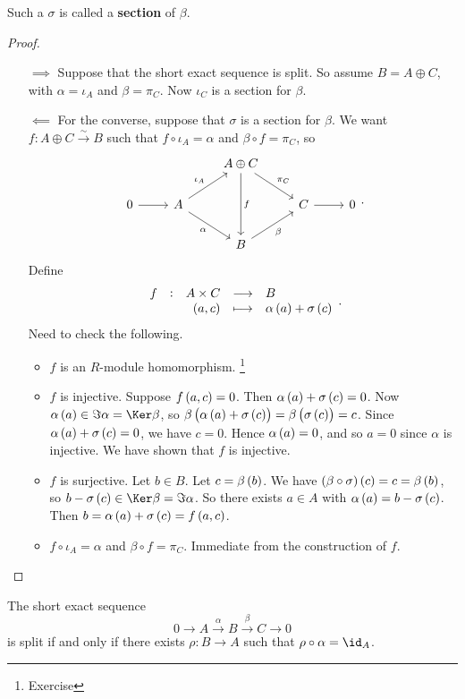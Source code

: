Such a $ \sigma $ is called a \textbf{section} of $ \beta $.

\begin{proof}
\hfill
\begin{itemize}
\item[$ \implies $] Suppose that the short exact sequence is split. So assume $ B = A \oplus C $, with $ \alpha = \iota_A $ and $ \beta = \pi_C $. Now $ \iota_C $ is a section for $ \beta $.
\item[$ \impliedby $] For the converse, suppose that $ \sigma $ is a section for $ \beta $. We want $ f : A \oplus C \xrightarrow{\sim} B $ such that $ f \circ \iota_A = \alpha $ and $ \beta \circ f = \pi_C $, so
$$
\begin{tikzcd}
& & A \oplus C \arrow{dr}{\pi_C} \arrow{dd}{f} & & \\
0 \arrow{r} & A \arrow{ur}{\iota_A} \arrow[swap]{dr}{\alpha} & & C \arrow{r} & 0 \\
& & B \arrow[swap]{ur}{\beta} & &
\end{tikzcd}.
$$
Define
$$ \function[f]{A \times C}{B}{\br{a, c}}{\alpha\br{a} + \sigma\br{c}}. $$
Need to check the following.
\begin{itemize}
\item $ f $ is an $ R $-module homomorphism. \footnote{Exercise}
\item $ f $ is injective. Suppose $ f\br{a, c} = 0 $. Then $ \alpha\br{a} + \sigma\br{c} = 0 $. Now $ \alpha\br{a} \in \Im \alpha = \Ker \beta $, so $ \beta\br{\alpha\br{a} + \sigma\br{c}} = \beta\br{\sigma\br{c}} = c $. Since $ \alpha\br{a} + \sigma\br{c} = 0 $, we have $ c = 0 $. Hence $ \alpha\br{a} = 0 $, and so $ a = 0 $ since $ \alpha $ is injective. We have shown that $ f $ is injective.
\item $ f $ is surjective. Let $ b \in B $. Let $ c = \beta\br{b} $. We have $ \br{\beta \circ \sigma}\br{c} = c = \beta\br{b} $, so $ b - \sigma\br{c} \in \Ker \beta = \Im \alpha $. So there exists $ a \in A $ with $ \alpha\br{a} = b - \sigma\br{c} $. Then $ b = \alpha\br{a} + \sigma\br{c} = f\br{a, c} $.
\item $ f \circ \iota_A = \alpha $ and $ \beta \circ f = \pi_C $. Immediate from the construction of $ f $.
\end{itemize}
\end{itemize}
\end{proof}

\begin{proposition}
The short exact sequence
$$ 0 \to A \xrightarrow{\alpha} B \xrightarrow{\beta} C \to 0 $$
is split if and only if there exists $ \rho : B \to A $ such that $ \rho \circ \alpha = \id_A $.
\end{proposition}

